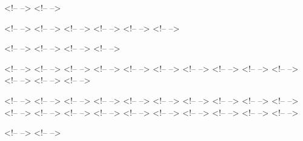 \newcommand{\PP}{{\mathbb{P}}}
\newcommand{\N}{{\mathbb{N}}}
\newcommand{\Nz}{{\mathbb{N}_0}}
\newcommand{\tot}{\tfrac{1}{2}}

<!-- \newcommand{\bZ}{{\mathbb{Z}}} -->
<!-- \newcommand{\R}{{\mathbb{R}}} -->

<!-- \newcommand{\sS}{{\mathcal{S}}} -->
<!-- \newcommand{\EE}{{\mathbb{E}}} -->
<!-- \newcommand{\Var}{\operatorname{Var}} -->
<!-- \newcommand{\Cov}{\operatorname{Cov}} -->
<!-- \newcommand{\corr}{\operatorname{corr}} -->
<!-- \newcommand{\Id}{\operatorname{Id}} -->

<!-- \newcommand{\ld}{\lambda} -->
<!-- \newcommand{\eand}{\text{ and }} -->
<!-- \newcommand{\efor}{\text{ for }} -->
<!-- \newcommand{\eforall}{\text{ forall }} -->

<!-- \newcommand{\tot}{\tfrac{1}{2}} -->
<!-- \newcommand{\seqz}[1]{\{#1_n\}_{n\in \N_0}} -->
<!-- \newcommand{\abs}[1]{|#1|} -->
<!-- \newcommand{\set}[1]{\{#1\}} -->
<!-- \newcommand{\tf}[2]{\frac{#1}{#2}} -->
<!-- \newcommand{\ot}{\frac{1}{2}} -->
<!-- \newcommand{\oo}[1]{\frac{1}{#1}} -->
<!-- \newcommand{\eps}{\varepsilon} -->
<!-- \newcommand{\inds}[1]{\mathbf{1}_{\{#1\}}} -->
<!-- \newcommand{\sets}[2]{ \{ #1\, : \, #2\}} -->
<!-- \newcommand{\ft}[2]{#1,\dots, #2} -->
<!-- \newcommand{\seq}[1]{\{#1_n\}_{n\in\N}} -->
<!-- \newcommand{\ewhere}{\text{ where }} -->

<!-- \renewcommand{\Pr}{{\mathbf P}} -->
<!-- \newcommand{\upn}[2]{#1^{(#2)}} -->
<!-- \newcommand{\Prup}[1]{\upn{\Pr}{#1}} -->
<!-- \newcommand{\Prz}{\Prup{0}} -->
<!-- \newcommand{\Pro}{\Prup{1}} -->
<!-- \newcommand{\Prn}{\Prup{n}} -->
<!-- \newcommand{\aaa}[1]{{a}^{(#1)}} -->
<!-- \renewcommand{\aa}[1]{{a}^{(#1)}} -->
<!-- \newcommand{\aaz}{\aaa{0}} -->
<!-- \newcommand{\az}{\aa{0}} -->
<!-- \renewcommand{\SS}{\sS} -->
<!-- \newcommand{\pnp}[1]{p^{(#1)}} -->
<!-- \newcommand{\pn}{\pnp{n}} -->
<!-- \newcommand{\tpnp}[1]{\tilde{p}^{(#1)}} -->
<!-- \newcommand{\tpn}{\tpnp{n}} -->
<!-- \newcommand{\fnf}[1]{f^{(#1)}} -->
<!-- \newcommand{\fn}{\fnf{n}} -->
<!-- \newcommand{\tofro}{\leftrightarrow} -->
<!-- \newcommand{\nto}{\not\!\to} -->
<!-- \newcommand{\Vn}{V^{(n)}} -->

<!-- \newcommand{\mat}[1]{\begin{bmatrix}#1\end{bmatrix}} -->
<!-- \newcommand{\pmat}[1]{\begin{bmatrix}#1\end{bmatrix}} -->

